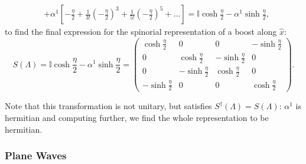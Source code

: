 \begin{example}
\[\begin{aligned}
                                           & + \alpha^1 \left[-\frac{\eta}{2} + \frac{1}{3!}\left(-\frac{\eta}{2}\right)^3 + \frac{1}{5!}\left(-\frac{\eta}{2}\right)^5 + \dots \right] = \mathbb{I}\cosh{\frac{\eta}{2}} - \alpha^1 \sinh{\frac{\eta}{2}},
        \end{aligned}
    \]
    to find the final expression for the spinorial representation of a boost along \(\hat{x}\):
    \[
        S(\Lambda) = \mathbb{I}\cosh{\frac{\eta}{2}} - \alpha^1 \sinh{\frac{\eta}{2}} = \begin{pmatrix}
            \cosh{\frac{\eta}{2}}  & 0                      & 0                      & -\sinh{\frac{\eta}{2}} \\
            0                      & \cosh{\frac{\eta}{2}}  & -\sinh{\frac{\eta}{2}} & 0                      \\
            0                      & -\sinh{\frac{\eta}{2}} & \cosh{\frac{\eta}{2}}  & 0                      \\
            -\sinh{\frac{\eta}{2}} & 0                      & 0                      & \cosh{\frac{\eta}{2}}
        \end{pmatrix}.
    \]

    Note that this transformation is not unitary, but satisfies \(S^{\dagger} (\Lambda) = S(\Lambda)\): \(\alpha^1\) is hermitian and computing further, we find the whole representation to be hermitian.
\end{example}

\subsubsection{Plane Waves}

